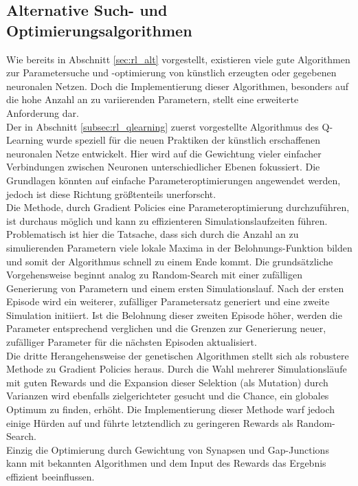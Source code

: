 	\subsection{Alternative Such- und Optimierungsalgorithmen}
		Wie bereits in Abschnitt \ref{sec:rl_alt} vorgestellt, existieren  viele gute Algorithmen zur Parametersuche und -optimierung von künstlich erzeugten oder gegebenen neuronalen Netzen. Doch die Implementierung dieser Algorithmen, besonders auf die hohe Anzahl an zu variierenden Parametern, stellt eine erweiterte Anforderung dar.\\
		Der in Abschnitt \ref{subsec:rl_qlearning} zuerst vorgestellte Algorithmus des Q-Learning wurde speziell für die neuen Praktiken der künstlich erschaffenen neuronalen Netze entwickelt. Hier wird auf die Gewichtung vieler einfacher Verbindungen zwischen Neuronen unterschiedlicher Ebenen fokussiert. Die Grundlagen könnten auf einfache Parameteroptimierungen angewendet werden, jedoch ist diese Richtung größtenteils unerforscht.\\
		Die Methode, durch Gradient Policies eine Parameteroptimierung durchzuführen, ist durchaus möglich und kann zu effizienteren Simulationslaufzeiten führen. Problematisch ist hier die Tatsache, dass sich durch die Anzahl an zu simulierenden Parametern viele lokale Maxima in der Belohnungs-Funktion bilden und somit der Algorithmus schnell zu einem Ende kommt. Die grundsätzliche Vorgehensweise beginnt analog zu Random-Search mit einer zufälligen Generierung von Parametern und einem ersten Simulationslauf. Nach der ersten Episode wird ein weiterer, zufälliger Parametersatz generiert und eine zweite Simulation initiiert. Ist die Belohnung dieser zweiten Episode höher, werden die Parameter entsprechend verglichen und die Grenzen zur Generierung neuer, zufälliger Parameter für die nächsten Episoden aktualisiert.\\
		Die dritte Herangehensweise der genetischen Algorithmen stellt sich als robustere Methode zu Gradient Policies heraus. Durch die Wahl mehrerer Simulationsläufe mit guten Rewards und die Expansion dieser Selektion (als Mutation) durch Varianzen wird ebenfalls zielgerichteter gesucht und die Chance, ein globales Optimum zu finden, erhöht. Die Implementierung dieser Methode warf jedoch einige Hürden auf und führte letztendlich zu geringeren Rewards als Random-Search.\\
		Einzig die Optimierung durch Gewichtung von Synapsen und Gap-Junctions kann mit bekannten Algorithmen und dem Input des Rewards das Ergebnis effizient beeinflussen.

